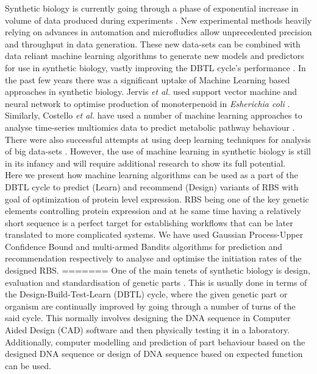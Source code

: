 \documentclass{article}
\begin{document}
Synthetic biology is currently going through a phase of exponential increase in volume of data produced during experiments \cite{Freemont2019}. New experimental methods heavily relying on advances in automation and microfludics allow unprecedented precision and throughput in data generation. These new data-sets can be combined with data reliant machine learning algorithms to generate new models and predictors for use in synthetic biology, vastly improving the DBTL cycle's performance \cite{Camacho2018}. In the past few years there was a significant uptake of Machine Learning based approaches in synthetic biology. Jervis \emph{et al.} used support vector machine and neural network to optimise production of monoterpenoid in \emph{Esherichia coli} \cite{Jervis2019}. Similarly, Costello \emph{et al.} have used a number of machine learning approaches to analyse time-series multiomics data to predict metabolic pathway behaviour \cite{Costello2018}. There were also successful attempts at using deep learning techniques for analysis of big data-sets \cite{Alipanahi2015,Angermueller2016}. However, the use of machine learning in synthetic biology is still in its infancy and will require additional research to show its full potential. \\
Here we present how machine learning algorithms can be used as a part of the DBTL cycle to predict (Learn) and recommend (Design) variants of RBS with goal of optimization of protein level expression. RBS being one of the key genetic elements controlling protein expression and at he same time having a relatively short sequence is a perfect target for establishing workflows that can be later translated to more complicated systems. We have used Gaussian Process-Upper Confidence Bound and multi-armed Bandits algorithms for prediction and recommendation respectively to analyse and optimise the initiation rates of the designed RBS.
=======
One of the main tenets of synthetic biology is design, evaluation and standardisation of genetic parts \cite{Brophy2014,Canton2008,Stanton2014}.
This is usually done in terms of the Design-Build-Test-Learn (DBTL) cycle, where the given genetic part or organism are continually improved by going through a number of turns of the said cycle.
This normally involves designing the DNA sequence in Computer Aided Design (CAD) software and then physically testing it in a laboratory.
Additionally, computer modelling and prediction of part behaviour based on the designed DNA sequence or design of DNA sequence based on expected function can be used\cite{Yeoh2019,Nielsen2016}.
\end{document}
